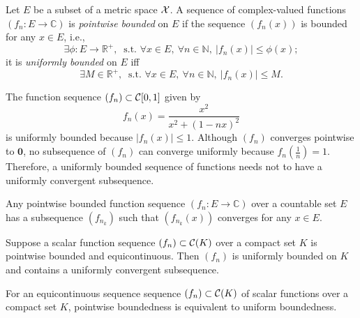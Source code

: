 \begin{defn}
  \label{def:uniformlyBounded}
  Let $E$ be a subset of a metric space ${\cal X}$.
  A sequence of complex-valued functions $(f_n: E\rightarrow\mathbb{C})$  
  is \emph{pointwise bounded} on $E$
  if the sequence $(f_n(x))$ is bounded for any $x\in E$, i.e.,
  \begin{equation}
    \label{eq:pointwiseBounded}
    \exists \phi:E\rightarrow\mathbb{R}^+,\ \text{ s.t. } \forall x\in E,\
    \forall n\in\mathbb{N},\ |f_n(x)|\le \phi(x);
  \end{equation}
  it is \emph{uniformly bounded} on $E$ iff
  \begin{equation}
    \label{eq:uniformlyBounded}
    \exists M\in \mathbb{R}^+,\ \text{ s.t. } \forall x\in E,\
    \forall n\in\mathbb{N},\ |f_n(x)|\le M.
  \end{equation}
\end{defn}

\begin{exm}
  \label{exm:uniformBoundednessNoConvSubsequence}
  The function sequence $(f_n)\subset {\cal C}[0,1]$ given by
  \begin{equation}
    \label{eq:FnotEquicontinuous}
    f_n(x)=\frac{x^2}{x^2+(1-nx)^2}
  \end{equation}
  is uniformly bounded because $|f_n(x)|\le 1$.
  Although $(f_n)$ converges pointwise to $\mathbf{0}$,
   no subsequence of $(f_n)$ can converge uniformly
   because $f_n(\frac{1}{n})=1$.
  Therefore, a uniformly bounded sequence of functions
   needs not to have a uniformly convergent subsequence.
\end{exm}

\begin{lem}
  \label{lem:pointwiseBoundedOnCountableSet}
  Any pointwise bounded function sequence $(f_n: E\rightarrow \mathbb{C})$
  over a countable set $E$ 
  has a subsequence $(f_{n_k})$
  such that $(f_{n_k}(x))$ converges for any $x\in E$. 
\end{lem}

\begin{thm}[Ascoli]
  \label{thm:AscoliSequence}
  Suppose a scalar function sequence $(f_n)\subset {\cal C}(K)$
  over a compact set $K$ is pointwise bounded and equicontinuous.
  Then $(f_n)$ is uniformly bounded on $K$
  and contains a uniformly convergent subsequence.
\end{thm}

\begin{coro}
  \label{coro:boundedPointwiseIsUniform}
  For an equicontinuous sequence  sequence $(f_n)\subset {\cal C}(K)$
  of scalar functions over a compact set $K$,
  pointwise boundedness is equivalent to uniform boundedness.  
\end{coro}

